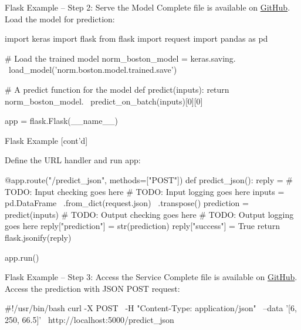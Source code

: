 \documentclass[ignorenonframetext,xcolor=x11names]{beamer}
\begin{document}
\begin{frame}[fragile]{Flask Example -- Step 2: Serve the Model}
Complete file is available on \href{https://github.com/jevermann/busi4720-mlops/blob/main/flask_deploy.py}{GitHub}. \\

Load the model for prediction:
\begin{pythoncode}
import keras
import flask
from flask import request
import pandas as pd

# Load the trained model
norm_boston_model = keras.saving. \
    load_model('norm.boston.model.trained.save')

# A predict function for the model
def predict(inputs):
    return norm_boston_model. \
        predict_on_batch(inputs)[0][0]

app = flask.Flask(__name__)
\end{pythoncode}
\end{frame}

\begin{frame}[fragile]{Flask Example \small [cont'd]}

Define the URL handler and run app:
\begin{pythoncode}
@app.route("/predict_json", methods=["POST"])
def predict_json():
    reply = {}
    # TODO: Input checking goes here
    # TODO: Input logging goes here
    inputs = pd.DataFrame \
               .from_dict(request.json) \
               .transpose()
    prediction = predict(inputs)
    # TODO: Output checking goes here
    # TODO: Output logging goes here
    reply["prediction"] = str(prediction)
    reply["success"] = True
    return flask.jsonify(reply)
    
app.run()
\end{pythoncode}
\end{frame}

\begin{frame}[fragile]{Flask Example -- Step 3: Access the Service}
Complete file is available on \href{https://github.com/jevermann/busi4720-mlops/blob/main/json_demo.sh}{GitHub}. \\

Access the prediction with JSON POST request:
\begin{bashcode}
#!/usr/bin/bash
curl -X POST \
     -H "Content-Type: application/json" \
     --data '[6, 250, 66.5]' \
     http://localhost:5000/predict_json
\end{bashcode}
\end{frame}
\end{document}
